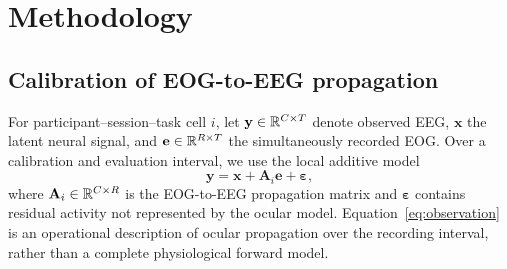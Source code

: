 \section{Methodology}
\label{sec:methodology}

\subsection{Calibration of EOG-to-EEG propagation}

For participant--session--task cell $i$, let $\mathbf{y}\in\mathbb{R}^{C\times T}$ denote observed EEG, $\mathbf{x}$ the latent neural signal, and $\mathbf{e}\in\mathbb{R}^{R\times T}$ the simultaneously recorded EOG. Over a calibration and evaluation interval, we use the local additive model
\begin{equation}
  \mathbf{y}=\mathbf{x}+\mathbf{A}_i\mathbf{e}+\boldsymbol{\varepsilon},
  \label{eq:observation}
\end{equation}
where $\mathbf{A}_i\in\mathbb{R}^{C\times R}$ is the EOG-to-EEG propagation matrix and $\boldsymbol{\varepsilon}$ contains residual activity not represented by the ocular model. Equation~\ref{eq:observation} is an operational description of ocular propagation over the recording interval, rather than a complete physiological forward model.

